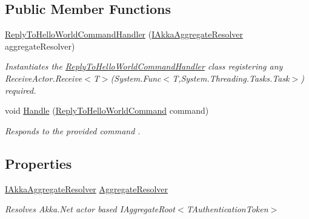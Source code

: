 \subsection*{Public Member Functions}
\begin{DoxyCompactItemize}
\item 
\hyperlink{classCqrs_1_1Akka_1_1Tests_1_1Unit_1_1Commands_1_1Handlers_1_1ReplyToHelloWorldCommandHandler_ac3c6ef2299fded8533f7e013e6cf763d_ac3c6ef2299fded8533f7e013e6cf763d}{Reply\+To\+Hello\+World\+Command\+Handler} (\hyperlink{interfaceCqrs_1_1Akka_1_1Domain_1_1IAkkaAggregateResolver}{I\+Akka\+Aggregate\+Resolver} aggregate\+Resolver)
\begin{DoxyCompactList}\small\item\em Instantiates the \hyperlink{classCqrs_1_1Akka_1_1Tests_1_1Unit_1_1Commands_1_1Handlers_1_1ReplyToHelloWorldCommandHandler}{Reply\+To\+Hello\+World\+Command\+Handler} class registering any Receive\+Actor.\+Receive$<$\+T$>$(\+System.\+Func$<$\+T,\+System.\+Threading.\+Tasks.\+Task$>$) required. \end{DoxyCompactList}\item 
void \hyperlink{classCqrs_1_1Akka_1_1Tests_1_1Unit_1_1Commands_1_1Handlers_1_1ReplyToHelloWorldCommandHandler_a647273b7056fc79b8b34b78981f6f193_a647273b7056fc79b8b34b78981f6f193}{Handle} (\hyperlink{classCqrs_1_1Akka_1_1Tests_1_1Unit_1_1Commands_1_1ReplyToHelloWorldCommand}{Reply\+To\+Hello\+World\+Command} command)
\begin{DoxyCompactList}\small\item\em Responds to the provided {\itshape command} . \end{DoxyCompactList}\end{DoxyCompactItemize}
\subsection*{Properties}
\begin{DoxyCompactItemize}
\item 
\hyperlink{interfaceCqrs_1_1Akka_1_1Domain_1_1IAkkaAggregateResolver}{I\+Akka\+Aggregate\+Resolver} \hyperlink{classCqrs_1_1Akka_1_1Tests_1_1Unit_1_1Commands_1_1Handlers_1_1ReplyToHelloWorldCommandHandler_a2c8f8e4cdceffd4a586f6f7a00962ca6_a2c8f8e4cdceffd4a586f6f7a00962ca6}{Aggregate\+Resolver}
\begin{DoxyCompactList}\small\item\em Resolves Akka.\+Net actor based I\+Aggregate\+Root$<$\+T\+Authentication\+Token$>$ \end{DoxyCompactList}\end{DoxyCompactItemize}


